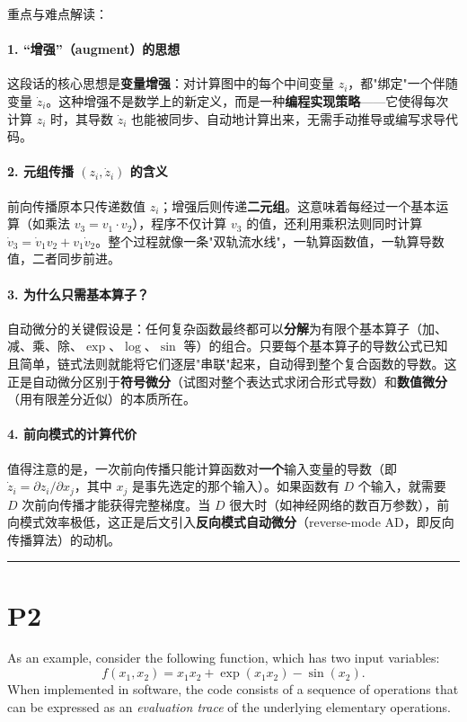\documentclass{article}
\begin{document}
{\color{blue}
重点与难点解读：

\paragraph{1. ``增强''（augment）的思想}
这段话的核心思想是\textbf{变量增强}：对计算图中的每个中间变量 $z_i$，都"绑定"一个伴随变量 $\dot{z}_i$。这种增强不是数学上的新定义，而是一种\textbf{编程实现策略}——它使得每次计算 $z_i$ 时，其导数 $\dot{z}_i$ 也能被同步、自动地计算出来，无需手动推导或编写求导代码。

\paragraph{2. 元组传播 $(z_i, \dot{z}_i)$ 的含义}
前向传播原本只传递数值 $z_i$；增强后则传递\textbf{二元组}。这意味着每经过一个基本运算（如乘法 $v_3 = v_1 \cdot v_2$），程序不仅计算 $v_3$ 的值，还利用乘积法则同时计算 $\dot{v}_3 = \dot{v}_1 v_2 + v_1 \dot{v}_2$。整个过程就像一条"双轨流水线"，一轨算函数值，一轨算导数值，二者同步前进。

\paragraph{3. 为什么只需基本算子？}
自动微分的关键假设是：任何复杂函数最终都可以\textbf{分解}为有限个基本算子（加、减、乘、除、$\exp$、$\log$、$\sin$ 等）的组合。只要每个基本算子的导数公式已知且简单，链式法则就能将它们逐层"串联"起来，自动得到整个复合函数的导数。这正是自动微分区别于\textbf{符号微分}（试图对整个表达式求闭合形式导数）和\textbf{数值微分}（用有限差分近似）的本质所在。

\paragraph{4. 前向模式的计算代价}
值得注意的是，一次前向传播只能计算函数对\textbf{一个}输入变量的导数（即 $\dot{z}_i = \partial z_i / \partial x_j$，其中 $x_j$ 是事先选定的那个输入）。如果函数有 $D$ 个输入，就需要 $D$ 次前向传播才能获得完整梯度。当 $D$ 很大时（如神经网络的数百万参数），前向模式效率极低，这正是后文引入\textbf{反向模式自动微分}（reverse-mode AD，即反向传播算法）的动机。
}

\noindent\rule{\linewidth}{0.4pt}

\section{P2}

As an example, consider the following function, which has two input variables:
\begin{equation}
f(x_1, x_2) = x_1 x_2 + \exp(x_1 x_2) - \sin(x_2).
\tag{8.49}
\end{equation}
When implemented in software, the code consists of a sequence of operations that can be expressed as an \emph{evaluation trace} of the underlying elementary operations. 
\end{document}
